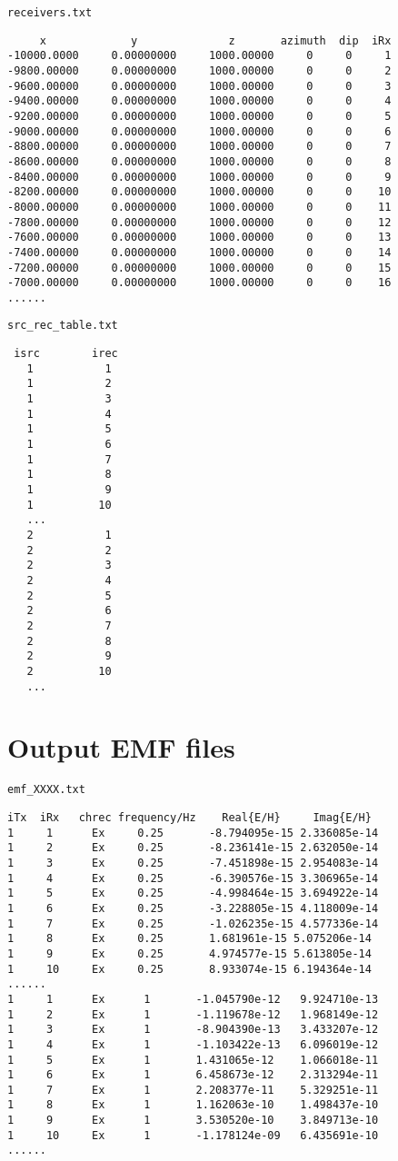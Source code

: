 \documentclass[a4paper,10pt]{article}
\begin{document}
\verb|receivers.txt|
\begin{verbatim}
     x             y              z       azimuth  dip  iRx
-10000.0000     0.00000000     1000.00000     0     0     1
-9800.00000     0.00000000     1000.00000     0     0     2
-9600.00000     0.00000000     1000.00000     0     0     3
-9400.00000     0.00000000     1000.00000     0     0     4
-9200.00000     0.00000000     1000.00000     0     0     5
-9000.00000     0.00000000     1000.00000     0     0     6
-8800.00000     0.00000000     1000.00000     0     0     7
-8600.00000     0.00000000     1000.00000     0     0     8
-8400.00000     0.00000000     1000.00000     0     0     9
-8200.00000     0.00000000     1000.00000     0     0    10
-8000.00000     0.00000000     1000.00000     0     0    11
-7800.00000     0.00000000     1000.00000     0     0    12
-7600.00000     0.00000000     1000.00000     0     0    13
-7400.00000     0.00000000     1000.00000     0     0    14
-7200.00000     0.00000000     1000.00000     0     0    15
-7000.00000     0.00000000     1000.00000     0     0    16
......
\end{verbatim}

\verb|src_rec_table.txt|
\begin{verbatim}
 isrc        irec
   1           1
   1           2
   1           3
   1           4
   1           5
   1           6
   1           7
   1           8
   1           9
   1          10
   ...
   2           1
   2           2
   2           3
   2           4
   2           5
   2           6
   2           7
   2           8
   2           9
   2          10
   ...
\end{verbatim}


\section{Output EMF files}
\verb|emf_XXXX.txt|
\begin{verbatim}
iTx  iRx   chrec frequency/Hz    Real{E/H}     Imag{E/H}
1     1      Ex     0.25       -8.794095e-15 2.336085e-14
1     2      Ex     0.25       -8.236141e-15 2.632050e-14
1     3      Ex     0.25       -7.451898e-15 2.954083e-14
1     4      Ex     0.25       -6.390576e-15 3.306965e-14
1     5      Ex     0.25       -4.998464e-15 3.694922e-14
1     6      Ex     0.25       -3.228805e-15 4.118009e-14
1     7      Ex     0.25       -1.026235e-15 4.577336e-14
1     8      Ex     0.25       1.681961e-15 5.075206e-14
1     9      Ex     0.25       4.974577e-15 5.613805e-14
1     10     Ex     0.25       8.933074e-15 6.194364e-14
......
1     1      Ex      1   	 -1.045790e-12 	 9.924710e-13
1     2      Ex      1   	 -1.119678e-12 	 1.968149e-12
1     3      Ex      1   	 -8.904390e-13 	 3.433207e-12
1     4      Ex      1   	 -1.103422e-13 	 6.096019e-12
1     5      Ex      1   	 1.431065e-12 	 1.066018e-11
1     6      Ex      1   	 6.458673e-12 	 2.313294e-11
1     7      Ex      1   	 2.208377e-11 	 5.329251e-11
1     8      Ex      1   	 1.162063e-10 	 1.498437e-10
1     9      Ex      1   	 3.530520e-10 	 3.849713e-10
1     10     Ex      1   	 -1.178124e-09 	 6.435691e-10
......
\end{verbatim}
\end{document}
